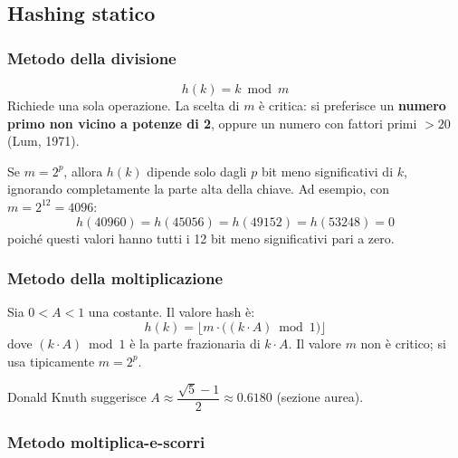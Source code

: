 \subsection{Hashing statico}

\subsubsection{Metodo della divisione}

\begin{definizione}
	\[
	h(k) = k \bmod m
	\]
	Richiede una sola operazione. La scelta di $m$ è critica: si preferisce un
	\textbf{numero primo non vicino a potenze di 2}, oppure un numero con
	fattori primi $> 20$ (Lum, 1971).
\end{definizione}

\begin{hardnote}
	Se $m = 2^p$, allora $h(k)$ dipende solo dagli $p$ bit meno significativi
	di $k$, ignorando completamente la parte alta della chiave. Ad esempio, con
	$m = 2^{12} = 4096$:
	\[
	h(40960) = h(45056) = h(49152) = h(53248) = 0
	\]
	poiché questi valori hanno tutti i 12 bit meno significativi pari a zero.
\end{hardnote}

\subsubsection{Metodo della moltiplicazione}

\begin{definizione}
	Sia $0 < A < 1$ una costante. Il valore hash è:
	\[
	h(k) = \bigl\lfloor m \cdot \bigl((k \cdot A) \bmod 1\bigr) \bigr\rfloor
	\]
	dove $(k \cdot A) \bmod 1$ è la parte frazionaria di $k \cdot A$. Il valore
	$m$ non è critico; si usa tipicamente $m = 2^p$.
\end{definizione}

\begin{nota}
	Donald Knuth suggerisce $A \approx \dfrac{\sqrt{5}-1}{2} \approx 0.6180$
	(sezione aurea).
\end{nota}

\subsubsection{Metodo moltiplica-e-scorri}

